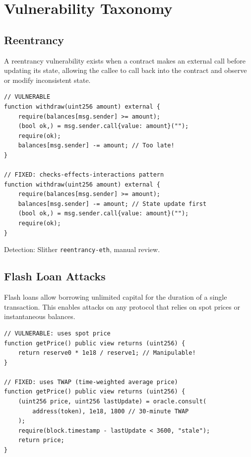 \section{Vulnerability Taxonomy}


\subsection{Reentrancy}

\begin{definition}[Reentrancy]
A reentrancy vulnerability exists when a contract makes an external call before updating
its state, allowing the callee to call back into the contract and observe or modify
inconsistent state.
\end{definition}

\begin{lstlisting}[language=Solidity,caption={Reentrancy vulnerability and fix}]
// VULNERABLE
function withdraw(uint256 amount) external {
    require(balances[msg.sender] >= amount);
    (bool ok,) = msg.sender.call{value: amount}("");
    require(ok);
    balances[msg.sender] -= amount; // Too late!
}

// FIXED: checks-effects-interactions pattern
function withdraw(uint256 amount) external {
    require(balances[msg.sender] >= amount);
    balances[msg.sender] -= amount; // State update first
    (bool ok,) = msg.sender.call{value: amount}("");
    require(ok);
}
\end{lstlisting}

Detection: Slither \texttt{reentrancy-eth}, manual review.

\subsection{Flash Loan Attacks}

Flash loans allow borrowing unlimited capital for the duration of a single transaction.
This enables attacks on any protocol that relies on spot prices or instantaneous balances.

\begin{lstlisting}[language=Solidity,caption={Flash loan attack on a naive oracle}]
// VULNERABLE: uses spot price
function getPrice() public view returns (uint256) {
    return reserve0 * 1e18 / reserve1; // Manipulable!
}

// FIXED: uses TWAP (time-weighted average price)
function getPrice() public view returns (uint256) {
    (uint256 price, uint256 lastUpdate) = oracle.consult(
        address(token), 1e18, 1800 // 30-minute TWAP
    );
    require(block.timestamp - lastUpdate < 3600, "stale");
    return price;
}
\end{lstlisting}

